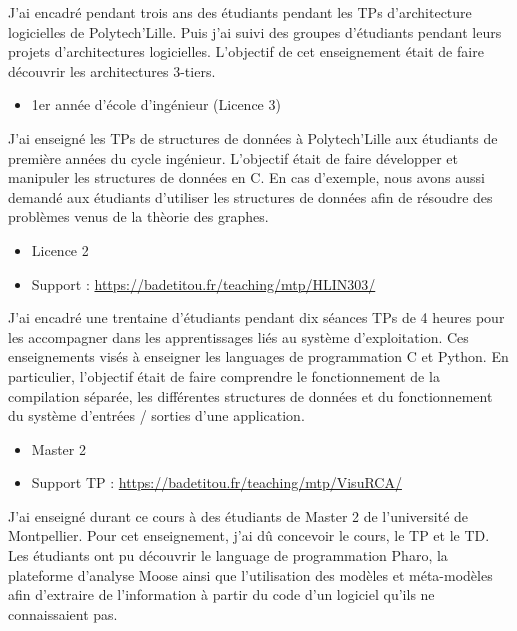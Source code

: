 \documentclass[10pt,a4paper,ragged2e,withhyper]{altacv}
\begin{document}
J'ai encadré pendant trois ans des étudiants pendant les TPs d'architecture logicielles de Polytech'Lille.
Puis j'ai suivi des groupes d'étudiants pendant leurs projets d'architectures logicielles.
L'objectif de cet enseignement était de faire découvrir les architectures 3-tiers.

\divider

\begin{itemize}
\item 1er année d'école d'ingénieur (Licence 3)
\end{itemize}

J'ai enseigné les TPs de structures de données à Polytech'Lille aux étudiants de première années du cycle ingénieur.
L'objectif était de faire développer et manipuler les structures de données en C.
En cas d'exemple, nous avons aussi demandé aux étudiants d'utiliser les structures de données afin de résoudre des problèmes venus de la thèorie des graphes.

\divider
\pagebreak

\begin{itemize}
  \item Licence 2
  \item Support : \url{https://badetitou.fr/teaching/mtp/HLIN303/}
\end{itemize}
J'ai encadré une trentaine d'étudiants pendant dix séances TPs de 4 heures pour les accompagner dans les apprentissages liés au système d'exploitation.
Ces enseignements visés à enseigner les languages de programmation C et Python.
En particulier, l'objectif était de faire comprendre le fonctionnement de la compilation séparée,
les différentes structures de données
et du fonctionnement du système d'entrées / sorties d'une application.


\divider


\begin{itemize}
\item Master 2
\item Support TP : \url{https://badetitou.fr/teaching/mtp/VisuRCA/}
\end{itemize}

J'ai enseigné durant ce cours à des étudiants de Master 2 de l'université de Montpellier.
Pour cet enseignement, j'ai dû concevoir le cours, le TP et le TD.
Les étudiants ont pu découvrir le language de programmation Pharo, la plateforme d'analyse Moose ainsi que l'utilisation des modèles et méta-modèles afin d'extraire de l'information à partir du code d'un logiciel qu'ils ne connaissaient pas.
\end{document}
